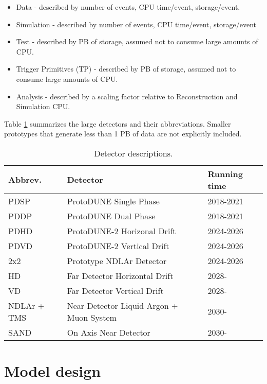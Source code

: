 \documentclass[12pt]{article}
\begin{document}
\begin{itemize}
\item Data - described by number of events, CPU time/event, storage/event. 
\item Simulation - described by number of events,  CPU time/event, storage/event
\item Test - described by PB of storage, assumed not to consume large amounts of CPU.
\item Trigger Primitives (TP) - described by PB of storage, assumed not to consume large amounts of CPU.
\item Analysis - described by a scaling factor relative to Reconstruction and Simulation CPU.
\end{itemize}

 Table \ref{tab:detectors} summarizes the large detectors and their abbreviations. Smaller prototypes that generate less than 1 PB of data  are not explicitly included. 

\begin{table}[h]
\begin{centering}
  \begin{tabular}{|l|l|l|}
     \hline
    Abbrev. & Detector & Running time\\
    \hline
    PDSP & ProtoDUNE Single Phase & 2018-2021\\
    PDDP & ProtoDUNE Dual Phase & 2018-2021\\
    PDHD & ProtoDUNE-2 Horizonal Drift & 2024-2026\\
    PDVD & ProtoDUNE-2 Vertical Drift & 2024-2026\\
    2x2& Prototype NDLAr Detector & 2024-2026\\
    HD & Far Detector Horizontal Drift & 2028-\\
    VD & Far Detector Vertical Drift & 2028-\\
    NDLAr + TMS & Near Detector Liquid Argon + Muon System & 2030-\\
    SAND & On Axis Near Detector & 2030- \\
     \hline
     \end{tabular}
       \caption{Detector descriptions. }\label{tab:detectors}
  \end{centering}
   
     \end{table}
     
  \section{Model design}
  
\end{document}

